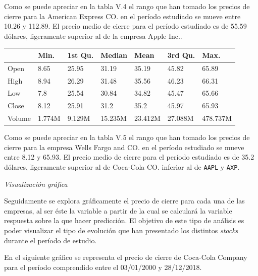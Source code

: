 \documentclass[]{DissertateUSU}
\begin{document}
\noindent Como se puede apreciar en la tabla V.4 el rango que han tomado
los precios de cierre para la American Express CO. en el período
estudiado se mueve entre 10.26 y 112.89. El precio medio de cierre para
el período estudiado es de 55.59 dólares, ligeramente superior al de la
empresa Apple Inc..

\begin{table}[H]
\centering\begingroup\fontsize{10}{12}\selectfont

\begin{tabular}{l|l|l|l|l|l|l}
\hline
  & Min. & 1st Qu. & Median & Mean & 3rd Qu. & Max.\\
\hline
Open & 8.65 & 25.95 & 31.19 & 35.19 & 45.82 & 65.89\\
\hline
High & 8.94 & 26.29 & 31.48 & 35.56 & 46.23 & 66.31\\
\hline
Low & 7.8 & 25.54 & 30.84 & 34.82 & 45.47 & 65.66\\
\hline
Close & 8.12 & 25.91 & 31.2 & 35.2 & 45.97 & 65.93\\
\hline
Volume & 1.774M & 9.129M & 15.235M & 23.412M & 27.088M & 478.737M\\
\hline
\end{tabular}
\endgroup{}
\end{table}

\setlength\parskip{5ex}
\justifying

\noindent Como se puede apreciar en la tabla V.5 el rango que han tomado
los precios de cierre para la empresa Wells Fargo and CO. en el período
estudiado se mueve entre 8.12 y 65.93. El precio medio de cierre para el
período estudiado es de 35.2 dólares, ligeramente superior al de
Coca-Cola CO. inferior al de \texttt{AAPL} y \texttt{AXP}.

\emph{Visualización gráfica}

\noindent Seguidamente se explora gráficamente el precio de cierre para
cada una de las empresas, al ser éste la variable a partir de la cual se
calculará la variable respuesta sobre la que hacer predicción. El
objetivo de este tipo de análisis es poder visualizar el tipo de
evolución que han presentado los distintos \emph{stocks} durante el
período de estudio.

\setlength\parskip{5ex}
\justifying

\noindent En el siguiente gráfico se representa el precio de cierre de
Coca-Cola Company para el período comprendido entre el 03/01/2000 y
28/12/2018.
\end{document}
